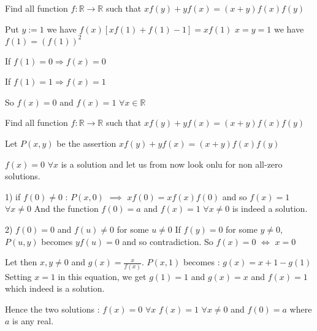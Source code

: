 \begin{solution}
	\begin{tcolorbox}Find all function $ f:\mathbb R \to \mathbb R$ such that $xf(y)+yf(x)=(x+y)f(x)f(y)$\end{tcolorbox}

Put 
$y:=1$ we have $f(x)[xf(1)+f(1)-1]=xf(1)$
$x=y=1$ we have $f(1)=(f(1))^2 $

If $f(1)=0 \Rightarrow f(x)=0$

If $f(1)=1 \Rightarrow f(x)=1$

So $f(x)=0$ and $f(x)=1$ $\forall x \in \mathbb R$
\end{solution}



\begin{solution}
	\begin{tcolorbox}Find all function $ f:\mathbb R \to \mathbb R$ such that $xf(y)+yf(x)=(x+y)f(x)f(y)$\end{tcolorbox}
Let $P(x,y)$ be the assertion $xf(y)+yf(x)=(x+y)f(x)f(y)$

$f(x)=0$ $\forall x$ is a solution and let us from now look onlu for non all-zero solutions.

1) if $f(0)\ne 0$ :
$P(x,0)$ $\implies$ $xf(0)=xf(x)f(0)$ and so $f(x)=1$ $\forall x\ne 0$
And the function $f(0)=a$ and $f(x)=1$ $\forall x\ne 0$ is indeed a solution.

2) $f(0)=0$ and $f(u)\ne 0$ for some $u\ne 0$
If $f(y)=0$ for some $y\ne 0$, $P(u,y)$ becomes $yf(u)=0$ and so contradiction. So $f(x)=0$ $\iff$ $x=0$

Let then $x,y\ne 0$ and $g(x)=\frac x{f(x)}$. $P(x,1)$ becomes : $g(x)=x+1-g(1)$
Setting  $x=1$ in this equation, we get $g(1)=1$ and $g(x)=x$ and $f(x)=1$ which indeed is a solution.

Hence the two solutions :
$f(x)=0$ $\forall x$
$f(x)=1$ $\forall x\ne 0$ and $f(0)=a$ where $a$ is any real.
\end{solution}



